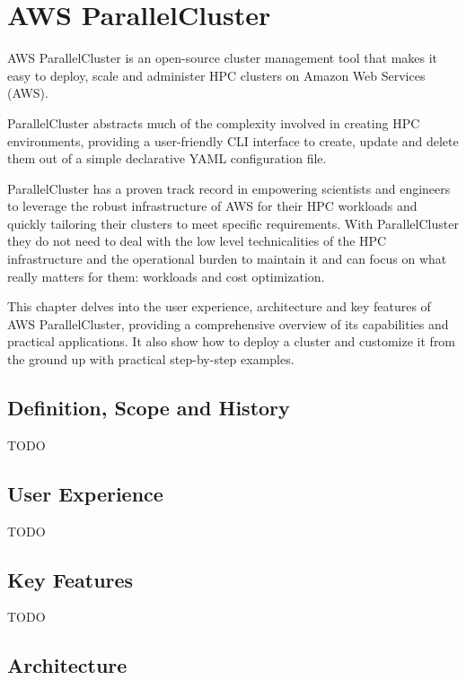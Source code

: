 

\chapter{AWS ParallelCluster}

AWS ParallelCluster is an open-source cluster management tool that makes it easy to deploy, scale and administer HPC clusters on Amazon Web Services (AWS). 

ParallelCluster abstracts much of the complexity involved in creating HPC environments, providing a user-friendly CLI interface to create, update and delete them out of a simple declarative YAML configuration file.

ParallelCluster has a proven track record in empowering scientists and engineers to leverage the robust infrastructure of AWS for their HPC workloads and quickly tailoring their clusters to meet specific requirements. With ParallelCluster they do not need to deal with the low level technicalities of the HPC infrastructure and the operational burden to maintain it and can focus on what really matters for them: workloads and cost optimization.

This chapter delves into the user experience, architecture and key features of AWS ParallelCluster, providing a comprehensive overview of its capabilities and practical applications. It also show how to deploy a cluster and customize it from the ground up with practical step-by-step examples.

\section{Definition, Scope and History}

TODO

\section{User Experience}

TODO

\section{Key Features}

TODO

\section{Architecture}

